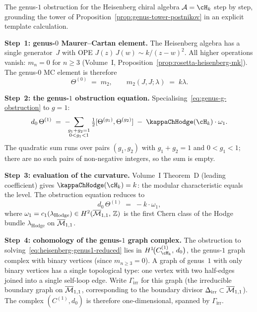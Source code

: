 \begin{computation}
\label{comp:heisenberg-genus1-obstruction}%
%
%
The genus-$1$ obstruction for the Heisenberg chiral
algebra $\cA = \cH_k$ step by step, grounding the tower of
Proposition~\ref{prop:genus-tower-postnikov} in an explicit
template calculation.

\smallskip
\noindent
\textbf{Step~1: genus-$0$ Maurer--Cartan element.}
The Heisenberg algebra has a single generator~$J$ with OPE
$J(z)\,J(w) \sim k/(z{-}w)^2$. All higher operations vanish:
$m_n = 0$ for $n \ge 3$
(Volume~I, Proposition~\ref{prop:rosetta-heisenberg-mk}).
The genus-$0$ MC element is therefore
\[
\Theta^{(0)} \;=\; m_2,
\qquad
m_2(J,J;\lambda) \;=\; k\lambda.
\]

\smallskip
\noindent
\textbf{Step~2: the genus-$1$ obstruction equation.}
Specialising~\eqref{eq:genus-g-obstruction} to $g = 1$:
\begin{equation}\label{eq:heisenberg-genus1-obstruction}
d_0\,\Theta^{(1)}
\;=\;
-\!\!\!\sum_{\substack{g_1 + g_2 = 1 \\ 0 < g_1 < 1}}
\tfrac{1}{2}[\Theta^{(g_1)},\Theta^{(g_2)}]
\;-\;
\kappaChHodge(\cH_k) \cdot \omega_1.
\end{equation}
The quadratic sum runs over pairs $(g_1,g_2)$ with
$g_1 + g_2 = 1$ and $0 < g_1 < 1$; there are no such pairs
of non-negative integers, so the sum is empty.

\smallskip
\noindent
\textbf{Step~3: evaluation of the curvature.}
Volume~I Theorem~D (leading coefficient) gives
$\kappaChHodge(\cH_k) = k$: the modular characteristic equals the
level. The obstruction equation reduces to
\begin{equation}\label{eq:heisenberg-genus1-reduced}
d_0\,\Theta^{(1)} \;=\; -k \cdot \omega_1,
\end{equation}
where
$\omega_1 = c_1(\lambda_{\mathrm{Hodge}})
\in H^2(\overline{\mathcal{M}}_{1,1},\,\mathbb{Z})$
is the first Chern class of the Hodge bundle
$\lambda_{\mathrm{Hodge}}$ on $\overline{\mathcal{M}}_{1,1}$.

\smallskip
\noindent
\textbf{Step~4: cohomology of the genus-$1$ graph complex.}
The obstruction to solving~\eqref{eq:heisenberg-genus1-reduced}
lies in
$H^1\!\bigl(C^{(1)}_{\cH_k},\, d_0\bigr)$,
the genus-$1$ graph complex with binary vertices
(since $m_{n \ge 3} = 0$). A graph of genus~$1$ with only
binary vertices has a single topological type: one vertex with
two half-edges joined into a single self-loop edge. Write
$\Gamma_{\mathrm{irr}}$ for this graph (the irreducible boundary
graph on $\overline{\mathcal{M}}_{1,1}$, corresponding to the boundary divisor
$\Delta_{\mathrm{irr}} \subset \overline{\mathcal{M}}_{1,1}$). The complex
$(C^{(1)},d_0)$ is therefore one-dimensional, spanned by
$\Gamma_{\mathrm{irr}}$.


\end{computation}
